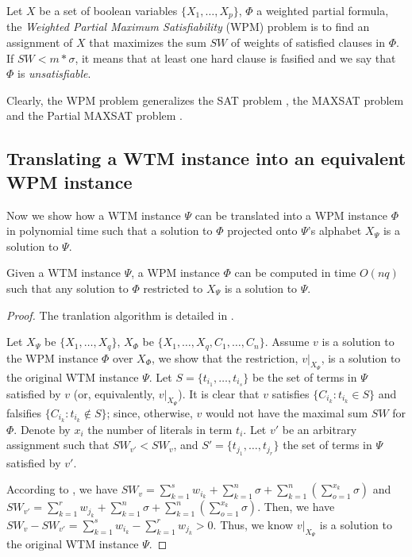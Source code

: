 \begin{definition}
	Let $X$ be a set of boolean variables $\{X_1, \ldots, X_p\}$, 
	$\Phi$ a weighted partial formula,
  the \textit{Weighted Partial Maximum Satisfiability} (WPM) problem 
	is to find an assignment of $X$ that 
	maximizes the sum $SW$ of
	weights of satisfied clauses in $\Phi$.
	If $SW < m*\sigma$, it means that at least one hard clause is fasified
	and we say that $\Phi$ is \textit{unsatisfiable}.
\end{definition}

Clearly, the WPM problem generalizes the SAT problem \cite{Garey:1979}, the MAXSAT 
problem \cite{cohen2004complete} and the Partial MAXSAT problem \cite{cohen2004complete}.


\subsection{Translating a WTM instance into an equivalent WPM instance}
Now we show how a WTM instance $\Psi$ can be translated into a WPM instance $\Phi$ 
in polynomial time such that a solution to $\Phi$ projected onto $\Psi$'s 
alphabet $X_\Psi$ is a solution to $\Psi$.
\begin{thm}
\label{thm:wtm_wpm}
	Given a WTM instance $\Psi$, a WPM instance $\Phi$ can be computed	in time 
	$O(nq)$ such that any solution to $\Phi$ restricted to $X_\Psi$ is a solution
	to $\Psi$.
\end{thm}
\begin{proof}
The tranlation algorithm is detailed in .

Let $X_\Psi$ be $\{X_1,\ldots,X_q\}$,
$X_\Phi$ be $\{X_1,\ldots,X_q,C_1,\ldots,C_n\}$.
Assume $v$ is a solution to the WPM instance $\Phi$ over $X_\Phi$, we show that
the restriction, $v|_{X_\Psi}$, is a solution to the original WTM instance $\Psi$.
Let $S=\{t_{i_1}, \ldots, t_{i_s}\}$ be the set of terms in $\Psi$ satisfied by $v$
(or, equivalently, $v|_{X_\Psi}$).
It is clear that $v$ satisfies $\{C_{i_k}:t_{i_k} \in S\}$ and falsifies
$\{C_{i_k}:t_{i_k} \not \in S\}$; since, otherwise,
$v$ would not have the maximal sum $\mathit{SW}$ for $\Phi$.
Denote by $x_i$ the number of literals in term $t_i$.
Let $v'$ be an arbitrary assignment such that $\mathit{SW}_{v'} < \mathit{SW}_v$,
and $S'=\{t_{j_1}, \ldots, t_{j_r}\}$ the set of terms in $\Psi$ satisfied by $v'$.

According to , we have
$\mathit{SW}_v=\sum_{k=1}^{s} w_{i_k}+\sum^n_{k=1} \sigma+\sum^n_{k=1}(\sum^{x_k}_{o=1} \sigma)$
and
$\mathit{SW}_{v'}=\sum^r_{k=1} w_{j_k}+\sum^n_{k=1} \sigma+\sum^n_{k=1}(\sum^{x_k}_{o=1} \sigma)$.  
Then, we have $\mathit{SW}_v-\mathit{SW}_{v'}=\sum_{k=1}^{s} w_{i_k} - \sum^r_{k=1} w_{j_k}>0$.
Thus, we know $v|_{X_\Psi}$ is a solution to the original WTM instance $\Psi$.
\end{proof}

